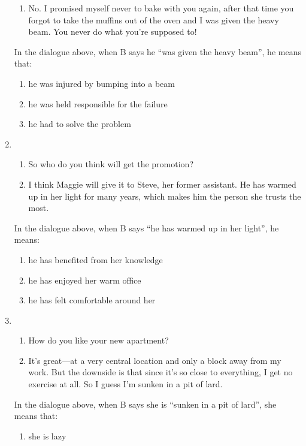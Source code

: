 \documentclass[output=paper]{langsci/langscibook}
\begin{document}
\begin{enumerate}
\begin{enumerate}[nosep,label=\Alph*:]
        \item No. I promised myself never to bake with you again, after that time you forgot to take the muffins out of the oven and I was given the heavy beam. You never do what you're supposed to!
        \end{enumerate}
        In the dialogue above, when B says he \enquote{was given the heavy beam}, he means that:
        \begin{enumerate}[label=\arabic*.,noitemsep]
        \item he was injured by bumping into a beam
        \item he was held responsible for the failure
        \item he had to solve the problem
        \end{enumerate}
    \item
       \begin{enumerate}[nosep,label=\Alph*:]
        \item So who do you think will get the promotion?
        \item I think Maggie will give it to Steve, her former assistant. He has warmed up in her light for many years, which makes him the person she trusts the most.
        \end{enumerate}
        In the dialogue above, when B says \enquote{he has warmed up in her light}, he means:
        \begin{enumerate}[label=\arabic*.,noitemsep]
        \item he has benefited from her knowledge
        \item he has enjoyed her warm office
        \item he has felt comfortable around her
        \end{enumerate}
    \item
       \begin{enumerate}[nosep,label=\Alph*:]
        \item How do you like your new apartment?
        \item It's great—at a very central location and only a block away from my work. But the downside is that since it's so close to everything, I get no exercise at all. So I guess I’m sunken in a pit of lard.
        \end{enumerate}
        In the dialogue above, when B says she is \enquote{sunken in a pit of lard}, she means that:
        \begin{enumerate}[label=\arabic*.,noitemsep]
        \item she is lazy

\end{enumerate}
\end{enumerate}
\end{document}
